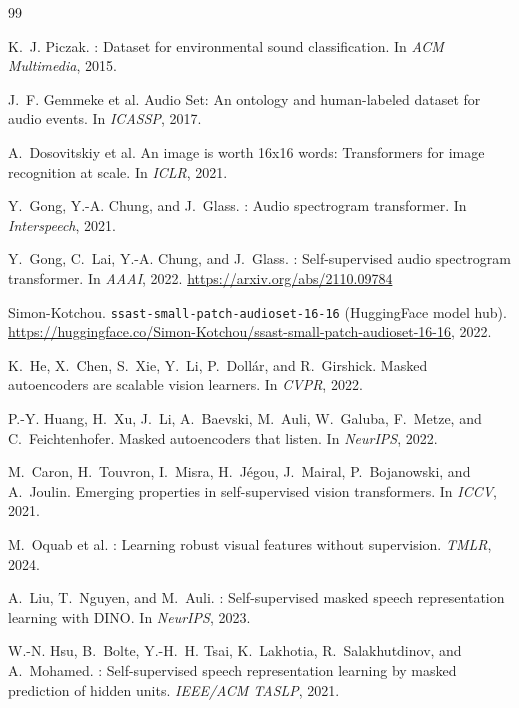 \documentclass{article}
\begin{document}
\begin{thebibliography}{99}

K.~J. Piczak.
: Dataset for environmental sound classification.
\newblock In \textit{ACM Multimedia}, 2015.

J.~F. Gemmeke et al.
\newblock Audio Set: An ontology and human-labeled dataset for audio events.
\newblock In \textit{ICASSP}, 2017.

A.~Dosovitskiy et al.
\newblock An image is worth 16x16 words: Transformers for image recognition at scale.
\newblock In \textit{ICLR}, 2021.

Y.~Gong, Y.-A. Chung, and J.~Glass.
: Audio spectrogram transformer.
\newblock In \textit{Interspeech}, 2021.

Y.~Gong, C.~Lai, Y.-A. Chung, and J.~Glass.
: Self-supervised audio spectrogram transformer.
\newblock In \textit{AAAI}, 2022.
\newblock \url{https://arxiv.org/abs/2110.09784}

Simon-Kotchou.
\newblock \texttt{ssast-small-patch-audioset-16-16} (HuggingFace model hub).
\newblock \url{https://huggingface.co/Simon-Kotchou/ssast-small-patch-audioset-16-16}, 2022.

K.~He, X.~Chen, S.~Xie, Y.~Li, P.~Doll{\'{a}}r, and R.~Girshick.
\newblock Masked autoencoders are scalable vision learners.
\newblock In \textit{CVPR}, 2022.

P.-Y. Huang, H.~Xu, J.~Li, A.~Baevski, M.~Auli, W.~Galuba, F.~Metze, and C.~Feichtenhofer.
\newblock Masked autoencoders that listen.
\newblock In \textit{NeurIPS}, 2022.

M.~Caron, H.~Touvron, I.~Misra, H.~J{\'{e}}gou, J.~Mairal, P.~Bojanowski, and A.~Joulin.
\newblock Emerging properties in self-supervised vision transformers.
\newblock In \textit{ICCV}, 2021.

M.~Oquab et al.
: Learning robust visual features without supervision.
\newblock \textit{TMLR}, 2024.

A.~Liu, T.~Nguyen, and M.~Auli.
: Self-supervised masked speech representation learning with {DINO}.
\newblock In \textit{NeurIPS}, 2023.

W.-N. Hsu, B.~Bolte, Y.-H.~H. Tsai, K.~Lakhotia, R.~Salakhutdinov, and A.~Mohamed.
: Self-supervised speech representation learning by masked prediction of hidden units.
\newblock \textit{IEEE/ACM TASLP}, 2021.

\end{thebibliography}
\end{document}

